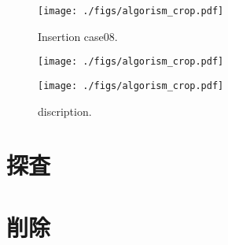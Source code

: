 
\begin{figure}[h]
  \texttt{[image: ./figs/algorism\_crop.pdf]}
  \caption{
    Insertion case08.
  }
  \label{fig_IpCHashT_insert_hard_case08}
\end{figure}

\begin{figure}[h]
\begin{center}
  \texttt{[image: ./figs/algorism\_crop.pdf]}
\end{center}
\end{figure}
\begin{center}
  \begin{figure}[h]
    \texttt{[image: ./figs/algorism\_crop.pdf]}
    \caption{
      discription.
    }
    \label{fig_IpCHashT_XXXX}
  \end{figure}
\end{center}


\section{探査}
\section{削除}










